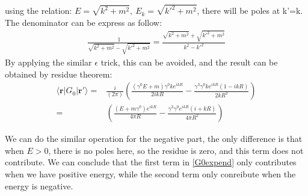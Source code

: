 \documentclass{article}
\numberwithin{equation}{section}
\begin{document}
using the relation: $E=\sqrt{k^2+m^2},\ E_k=\sqrt{k'^2+m^2}$, there will be poles at k'=k. The denominator can be express as follow:
\begin{align}
    \frac{1}{\sqrt{k^2+m^2}-\sqrt{k'^2+m^2}}=\frac{\sqrt{k^2+m^2}+\sqrt{k'^2+m^2}}{k^2-k'^2}
\end{align}
By applying the similar $\epsilon$ trick, this can be avoided, and the result can be obtained by residue theorem:
\begin{align}
    \langle \boldsymbol{r}| G_0 |\boldsymbol{r}'\rangle=&\frac{i}{(2\pi)}\left(\frac{(\gamma^0 E + m)\gamma^0 k e^{ikR}}{2ik R}-\frac{\gamma^3 \gamma^0 k e^{ikR}(1-ikR)}{2k R^2}\right)\nonumber\\
    =&\left(\frac{( E + m\gamma^0) e^{ikR}}{4\pi R}-\frac{\gamma^3 \gamma^0 e^{ikR}(i+kR)}{4\pi R^2}\right)
\end{align}

We can do the similar operation for the negative part, the only difference is that when $E>0$, there is no poles here, so the residue is zero, and this term does not contribute. We can conclude that the first term in \eqref{G0expend} only contributes when we have positive energy, while the second term only conreibute when the energy is negative.
\end{document}

